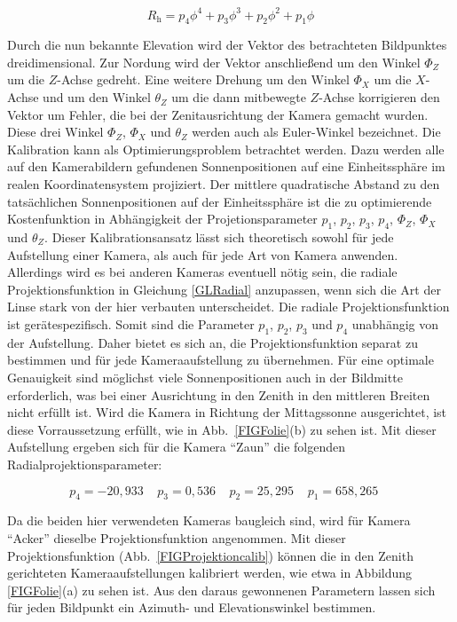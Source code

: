 \documentclass[a4paper,11pt,twoside,german]{article}
\newcommand{\absatz}{\smallbreak}
\begin{document}
\begin{equation}
\label{GLRadial}
R_\mathrm{h} = p_4 \phi ^ 4 + p_3 \phi ^ 3 + p_2 \phi ^ 2 + p_1 \phi
\end{equation}

Durch die nun bekannte Elevation wird der Vektor des betrachteten Bildpunktes
dreidimensional. Zur Nordung wird der Vektor anschließend um den Winkel $\Phi_Z$
um die $Z$-Achse gedreht. Eine weitere Drehung um den Winkel $\Phi_X$ um die
$X$-Achse und um den Winkel $\theta_Z$ um die dann mitbewegte $Z$-Achse
korrigieren den Vektor um Fehler, die bei der Ze\-nit\-aus\-rich\-tung der
Kamera gemacht wurden. Diese drei Winkel $\Phi_Z$, $\Phi_X$ und $\theta_Z$
werden auch als Euler-Winkel bezeichnet.
\absatz
Die Kalibration kann als Optimierungsproblem betrachtet werden. Dazu
werden alle auf den Kamerabildern gefundenen Sonnenpositionen auf eine
Einheitssphäre im realen Koordinatensystem projiziert. Der mittlere quadratische
Abstand zu den tatsächlichen Sonnenpositionen auf der Einheitssphäre ist die zu
optimierende Kostenfunktion in Ab\-häng\-ig\-keit der Projetionsparameter $p_1$,
$p_2$, $p_3$, $p_4$, $\Phi_Z$, $\Phi_X$ und $\theta_Z$.
\absatz
Dieser Kalibrationsansatz lässt sich theoretisch sowohl für jede Aufstellung
einer Kamera, als auch für jede Art von Kamera anwenden. Allerdings wird es bei
anderen Kameras eventuell nötig sein, die radiale Projektionsfunktion in
Gleichung \ref{GLRadial} anzupassen, wenn sich die Art der Linse stark von der
hier verbauten unterscheidet.
\absatz
Die radiale Projektionsfunktion ist gerätespezifisch. Somit sind die Parameter 
$p_1$, $p_2$, $p_3$ und $p_4$ unabhängig von der Aufstellung. Daher bietet es
sich an, die Projektionsfunktion separat zu bestimmen und für jede
Kameraaufstellung zu übernehmen. Für eine optimale Genauigkeit sind
möglichst viele Sonnenpositionen auch in der Bildmitte erforderlich, was bei
einer Ausrichtung in den Zenith in den mittleren Breiten nicht erfüllt ist.
Wird die Kamera in Richtung der Mittagssonne ausgerichtet, ist diese
Vorraussetzung erfüllt, wie in Abb.~\ref{FIGFolie}(b) zu sehen ist.
Mit dieser Aufstellung ergeben sich für die Kamera \enquote{Zaun} 
die folgenden Radialprojektionsparameter:

\begin{equation}
p_4 = -20,933 \;\;\;\;
p_3 = 0,536   \;\;\;\;
p_2 = 25,295  \;\;\;\;
p_1 = 658,265 \;\;\;\;
\end{equation}

Da die beiden hier verwendeten Kameras baugleich sind, wird für Kamera
\enquote{Acker} dieselbe Projektionsfunktion angenommen.  Mit dieser
Projektionsfunktion (Abb.~\ref{FIGProjektioncalib}) können die in den Zenith
gerichteten Kameraaufstellungen kalibriert werden, wie etwa in Abbildung
\ref{FIGFolie}(a) zu sehen ist. Aus den daraus gewonnenen Parametern lassen sich
für jeden Bildpunkt ein Azimuth- und Elevationswinkel bestimmen. 
\end{document}
